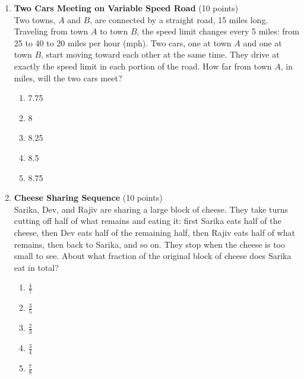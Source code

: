 \begin{enumerate}
  \newpage

  \item \textbf{Two Cars Meeting on Variable Speed Road} (10 points)\\
  Two towns, $A$ and $B$, are connected by a straight road, 15 miles long. Traveling from town $A$ to town $B$, the speed limit changes every 5 miles: from 25 to 40 to 20 miles per hour (mph). Two cars, one at town $A$ and one at town $B$, start moving toward each other at the same time. They drive at exactly the speed limit in each portion of the road. How far from town $A$, in miles, will the two cars meet?
  \begin{enumerate}[label=(\Alph*)]
    \item 7.75
    \item 8
    \item 8.25
    \item 8.5
    \item 8.75
  \end{enumerate}
  \begin{subanswer}
  \end{subanswer}

  \item \textbf{Cheese Sharing Sequence} (10 points)\\
  Sarika, Dev, and Rajiv are sharing a large block of cheese. They take turns cutting off half of what remains and eating it: first Sarika eats half of the cheese, then Dev eats half of the remaining half, then Rajiv eats half of what remains, then back to Sarika, and so on. They stop when the cheese is too small to see. About what fraction of the original block of cheese does Sarika eat in total?
  \begin{enumerate}[label=(\Alph*)]
    \item $\frac{4}{7}$
    \item $\frac{3}{5}$
    \item $\frac{2}{3}$
    \item $\frac{3}{4}$
    \item $\frac{7}{8}$
  \end{enumerate}
  \begin{subanswer}
  \end{subanswer}


  \newpage



\end{enumerate}
